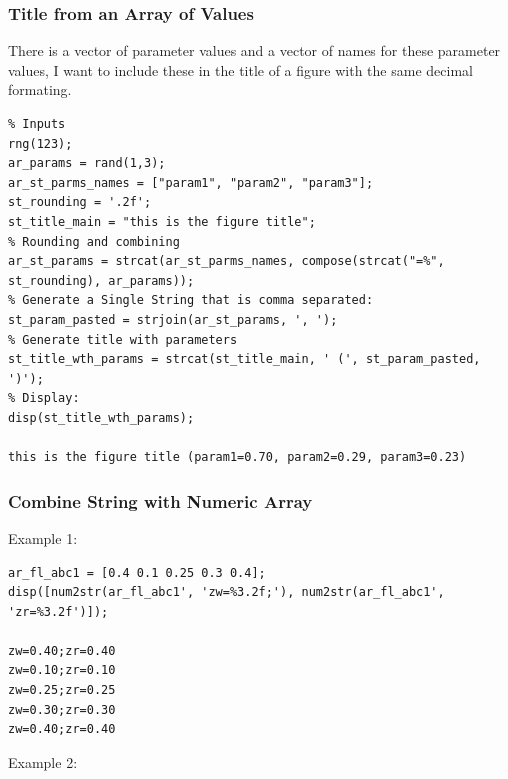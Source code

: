 \documentclass[
]{book}
\begin{document}
\hypertarget{title-from-an-array-of-values}{%
\subsubsection{Title from an Array of Values}\label{title-from-an-array-of-values}}

There is a vector of parameter values and a vector of names for these
parameter values, I want to include these in the title of a figure with
the same decimal formating.

\begin{verbatim}
% Inputs
rng(123);
ar_params = rand(1,3);
ar_st_parms_names = ["param1", "param2", "param3"];
st_rounding = '.2f';
st_title_main = "this is the figure title";
% Rounding and combining
ar_st_params = strcat(ar_st_parms_names, compose(strcat("=%", st_rounding), ar_params));
% Generate a Single String that is comma separated:
st_param_pasted = strjoin(ar_st_params, ', ');
% Generate title with parameters
st_title_wth_params = strcat(st_title_main, ' (', st_param_pasted, ')');
% Display:
disp(st_title_wth_params);

this is the figure title (param1=0.70, param2=0.29, param3=0.23)
\end{verbatim}

\hypertarget{combine-string-with-numeric-array}{%
\subsubsection{Combine String with Numeric Array}\label{combine-string-with-numeric-array}}

Example 1:

\begin{verbatim}
ar_fl_abc1 = [0.4 0.1 0.25 0.3 0.4];
disp([num2str(ar_fl_abc1', 'zw=%3.2f;'), num2str(ar_fl_abc1', 'zr=%3.2f')]);

zw=0.40;zr=0.40
zw=0.10;zr=0.10
zw=0.25;zr=0.25
zw=0.30;zr=0.30
zw=0.40;zr=0.40
\end{verbatim}

Example 2:
\end{document}
